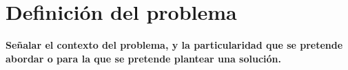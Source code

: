 \section{Definición del problema}\label{sc:DefProb}

\textbf{Señalar el contexto del problema, y la particularidad que se pretende abordar o para la que se pretende plantear una solución.}